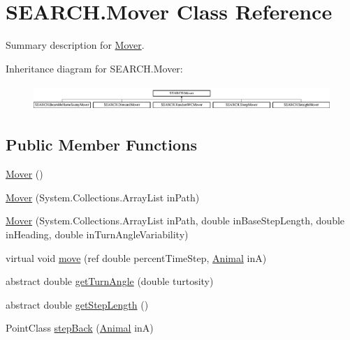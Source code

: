\hypertarget{class_s_e_a_r_c_h_1_1_mover}{\section{S\-E\-A\-R\-C\-H.\-Mover Class Reference}
\label{class_s_e_a_r_c_h_1_1_mover}
}


Summary description for \hyperlink{class_s_e_a_r_c_h_1_1_mover}{Mover}.  


Inheritance diagram for S\-E\-A\-R\-C\-H.\-Mover\-:\begin{figure}[H]
\begin{center}
\leavevmode
\includegraphics[height=0.982456cm]{class_s_e_a_r_c_h_1_1_mover}
\end{center}
\end{figure}
\subsection*{Public Member Functions}
\begin{DoxyCompactItemize}
\item 
\hyperlink{class_s_e_a_r_c_h_1_1_mover_aafc7e67b5b0bd68f9cfec99f68d76309}{Mover} ()
\item 
\hyperlink{class_s_e_a_r_c_h_1_1_mover_ac79713250c11901b081e460f3a0aef0c}{Mover} (System.\-Collections.\-Array\-List in\-Path)
\item 
\hyperlink{class_s_e_a_r_c_h_1_1_mover_a05f02fd5a8ba930d331210167c8268a0}{Mover} (System.\-Collections.\-Array\-List in\-Path, double in\-Base\-Step\-Length, double in\-Heading, double in\-Turn\-Angle\-Variability)
\item 
virtual void \hyperlink{class_s_e_a_r_c_h_1_1_mover_ab2dfc659f3817ea48d66ff4d7e464d1d}{move} (ref double percent\-Time\-Step, \hyperlink{class_s_e_a_r_c_h_1_1_animal}{Animal} in\-A)
\item 
abstract double \hyperlink{class_s_e_a_r_c_h_1_1_mover_a879a44d5a0c57434375a69c8d8d00e35}{get\-Turn\-Angle} (double turtosity)
\item 
abstract double \hyperlink{class_s_e_a_r_c_h_1_1_mover_a3e547800bbc34492f4251adee70dbf02}{get\-Step\-Length} ()
\item 
Point\-Class \hyperlink{class_s_e_a_r_c_h_1_1_mover_ae1603ac731e59e6b4ffc485e5b81e846}{step\-Back} (\hyperlink{class_s_e_a_r_c_h_1_1_animal}{Animal} in\-A)
\end{DoxyCompactItemize}
